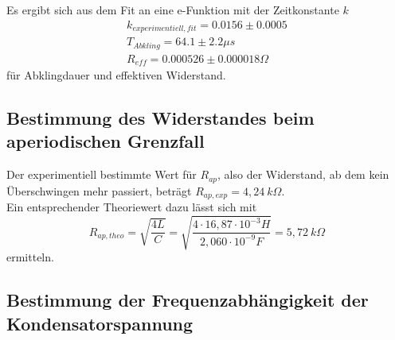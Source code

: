 Es ergibt sich aus dem Fit an eine e-Funktion mit der Zeitkonstante $k$
\begin{align*}
  k_{experimentiell,fit} = 0.0156 \pm 0.0005 \\
  T_{Abkling} = 64.1 \pm 2.2 \mu s \\
  R_{eff} = 0.000526 \pm 0.000018 \Omega 
\end{align*}
für Abklingdauer und effektiven Widerstand.




\subsection{Bestimmung des Widerstandes beim aperiodischen Grenzfall}
\label{R_ap}

Der experimentiell bestimmte Wert für $R_{ap}$, also der Widerstand, ab dem kein Überschwingen mehr passiert, beträgt $R_{ap,exp} = 4,24 \: k\Omega$. \\
Ein entsprechender Theoriewert dazu lässt sich mit 
\begin{equation*}
  R_{ap,theo} = \sqrt{\frac{4L}{C}} = \sqrt{\frac{4 \cdot 16,87 \cdot 10^{-3}H}{2,060 \cdot 10^{-9}F}} = 5,72 \: k\Omega
\end{equation*}
ermitteln.






\subsection{Bestimmung der Frequenzabhängigkeit der Kondensatorspannung}
\label{Kondensatorspannung}

